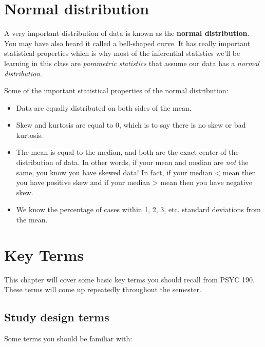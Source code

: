 \documentclass[
]{book}
\begin{document}
\hypertarget{normal-distribution}{%
\section{Normal distribution}\label{normal-distribution}}

A very important distribution of data is known as the \textbf{normal distribution}. You may have also heard it called a bell-shaped curve. It has really important statistical properties which is why most of the inferential statistics we'll be learning in this class are \emph{parametric statistics} that assume our data has a \emph{normal distribution}.

Some of the important statistical properties of the normal distribution:

\begin{itemize}
\item
  Data are equally distributed on both sides of the mean.
\item
  Skew and kurtosis are equal to 0, which is to say there is no skew or bad kurtosis.
\item
  The mean is equal to the median, and both are the exact center of the distribution of data. In other words, if your mean and median are \emph{not} the same, you know you have skewed data! In fact, if your median \textless{} mean then you have positive skew and if your median \textgreater{} mean then you have negative skew.
\item
  We know the percentage of cases within 1, 2, 3, etc. standard deviations from the mean.
\end{itemize}

\hypertarget{key-terms}{%
\section{Key Terms}\label{key-terms}}

This chapter will cover some basic key terms you should recall from PSYC 190. These terms will come up repeatedly throughout the semester.

\hypertarget{study-design-terms}{%
\subsection{Study design terms}\label{study-design-terms}}

Some terms you should be familiar with:
\end{document}
